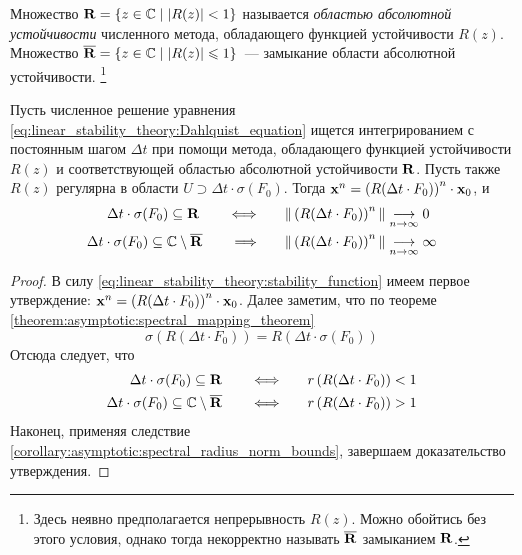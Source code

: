 \begin{definition}
    \label{definition:asymptotic:stability_region}
    Множество $ \mathbf{R} = \{ z \in \mathbb{C} \mid | R(z) | < 1 \} $ называется \emph{областью абсолютной устойчивости} численного метода, обладающего функцией устойчивости $ R(z) $.
    Множество $ \overline{\mathbf{R}} = \{ z \in \mathbb{C} \mid | R(z) | \leqslant 1 \} $~--- замыкание области абсолютной устойчивости.%
    \footnote{Здесь неявно предполагается непрерывность $ R(z) $.
    Можно обойтись без этого условия, однако тогда некорректно называть $ \overline{\mathbf{R}} $ замыканием $ \mathbf{R} $.}
\end{definition}

\begin{statement}
    \label{statement:asymptotic:linear_numerical_stability}
    Пусть численное решение уравнения \eqref{eq:linear_stability_theory:Dahlquist_equation}
    ищется интегрированием с постоянным шагом $ \Delta t $
    при помощи метода, обладающего функцией устойчивости $ R(z) $ и соответствующей областью абсолютной устойчивости $ \mathbf{R} $.
    Пусть также $ R(z) $ регулярна в области $ U \supset \Delta t \cdot \sigma(F_0) $.
    Тогда $ \mathbf{x}^n = \left( R(\Delta t \cdot F_0) \right)^n \cdot \mathbf{x}_0 $, и
    \begin{align}
        \Delta t \cdot \sigma(F_0) \subseteq \mathbf{R} \qquad \Longleftrightarrow \qquad & \| \left( R(\Delta t \cdot F_0) \right)^n \| \underset{n \to \infty}{\longrightarrow} 0 \\
        \Delta t \cdot \sigma(F_0) \subseteq \mathbb{C} \setminus \overline{\mathbf{R}} \qquad \Longrightarrow \qquad & \| \left( R(\Delta t \cdot F_0) \right)^n \| \underset{n \to \infty}{\longrightarrow} \infty
    \end{align}
\end{statement}

\begin{proof}
    В силу \eqref{eq:linear_stability_theory:stability_function} имеем первое утверждение:
    $ \mathbf{x}^n = \left( R(\Delta t \cdot F_0) \right)^n \cdot \mathbf{x}_0 $.
    Далее заметим, что по теореме \ref{theorem:asymptotic:spectral_mapping_theorem}
    \[
        \sigma\left( R(\Delta t \cdot F_0) \right) = R\left( \Delta t \cdot \sigma(F_0) \right)
    \]
    Отсюда следует, что
    \begin{align}
        \Delta t \cdot \sigma(F_0) \subseteq \mathbf{R} \qquad \Longleftrightarrow \qquad & r\left( R(\Delta t \cdot F_0) \right) < 1 \\
        \Delta t \cdot \sigma(F_0) \subseteq \mathbb{C} \setminus \overline{\mathbf{R}} \qquad \Longleftrightarrow \qquad & r\left( R(\Delta t \cdot F_0) \right) > 1
    \end{align}
    Наконец, применяя следствие \ref{corollary:asymptotic:spectral_radius_norm_bounds}, завершаем доказательство утверждения.
\end{proof}

